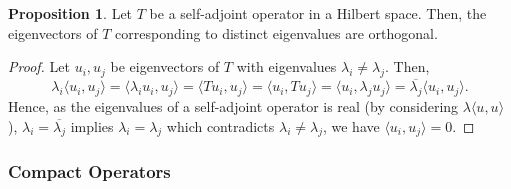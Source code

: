 \documentclass[]{article}
\theoremstyle{definition}
\theoremstyle{definition}
\newtheorem{proposition}{Proposition}[section]
\begin{document}
\begin{proposition}
  Let \(T\) be a self-adjoint operator in a Hilbert space. Then, the eigenvectors 
  of \(T\) corresponding to distinct eigenvalues are orthogonal.
\end{proposition}
\begin{proof}
  Let \(u_i, u_j\) be eigenvectors of \(T\) with eigenvalues \(\lambda_i \neq \lambda_j\). 
  Then, 
  \[\lambda_i \langle u_i, u_j\rangle = \langle \lambda_i u_i, u_j \rangle 
  = \langle Tu_i, u_j\rangle = \langle u_i, Tu_j\rangle = \langle u_i, \lambda_j u_j \rangle
  = \overline{\lambda_j}\langle u_i, u_j\rangle.\]
  Hence, as the eigenvalues of a self-adjoint operator is real (by considering 
  \(\lambda \langle u, u \rangle\)), 
  \(\lambda_i = \overline{\lambda_j}\) implies \(\lambda_i = \lambda_j\) which 
  contradicts \(\lambda_i \neq \lambda_j\), we have \(\langle u_i, u_j\rangle = 0\).
\end{proof}

\subsubsection{Compact Operators}
\end{document}
